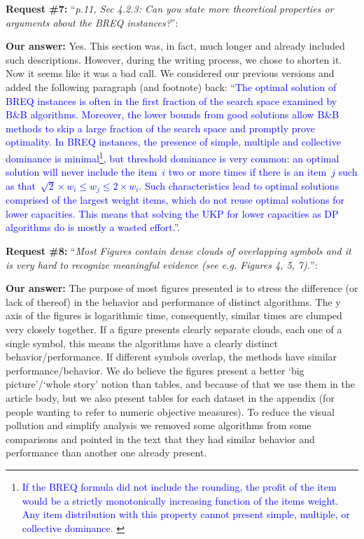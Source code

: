 \documentclass{elsarticle}
\begin{document}
\textbf{Request \#7:} ``\textit{p.11, Sec 4.2.3: Can you state more theoretical properties or arguments about the BREQ instances?}'': 

\textbf{Our answer:} Yes. This section was, in fact, much longer and already included such descriptions. However, during the writing process, we chose to shorten it. Now it seems like it was a bad call. We considered our previous versions and added the following paragraph (and footnote) back: ``\textcolor{blue}{The optimal solution of BREQ instances is often in the first fraction of the search space examined by B\&B algorithms. Moreover, the lower bounds from good solutions allow B\&B methods to skip a large fraction of the search space and promptly prove optimality. In BREQ instances, the presence of simple, multiple and collective dominance is minimal\footnote{\textcolor{blue}{
If the BREQ formula did not include the rounding, the profit of the item would be a strictly monotonically increasing function of the items weight.
Any item distribution with this property cannot present simple, multiple, or collective dominance.
}}, but threshold dominance is very common: an optimal solution will never include the item~\(i\) two or more times if there is an item~\(j\) such as that~\(\sqrt{2} \times w_i \leq w_j \leq 2 \times w_i\).
Such characteristics lead to optimal solutions comprised of the largest weight items, which do not reuse optimal solutions for lower capacities.
This means that solving the UKP for lower capacities as DP algorithms do is mostly a wasted effort.}''.
\medskip

\textbf{Request \#8:} ``\textit{Most Figures contain dense clouds of overlapping symbols and it is very hard to recognize meaningful evidence (see e.g. Figures 4, 5, 7).}'': 

\textbf{Our answer:} The purpose of most figures presented is to stress the difference (or lack of thereof) in the behavior and performance of distinct algorithms. The y axis of the figures is logarithmic time, consequently, similar times are clumped very closely together. If a figure presents clearly separate clouds, each one of a single symbol, this means the algorithms have a clearly distinct behavior/performance. If different symbols overlap, the methods have similar performance/behavior. We do believe the figures present a better `big picture'/`whole story' notion than tables, and because of that we use them in the article body, but we also present tables for each dataset in the appendix (for people wanting to refer to numeric objective measures). To reduce the visual pollution and simplify analysis we removed some algorithms from some comparisons and pointed in the text that they had similar behavior and performance than another one already present.
\medskip
\end{document}
